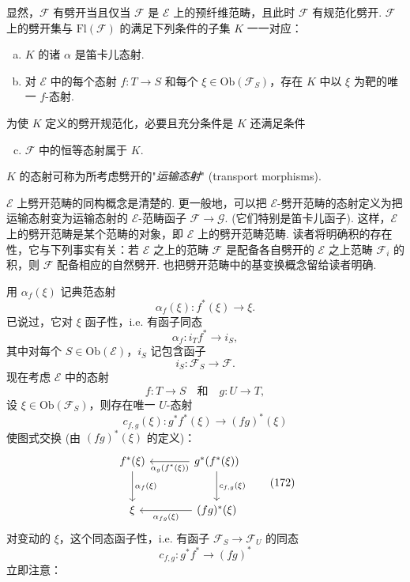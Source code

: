 显然，$\mathcal{F}$ 有劈开当且仅当 $\mathcal{F}$ 是 $\mathcal{E}$ 上的预纤维范畴，且此时 $\mathcal{F}$ 有规范化劈开. $\mathcal{F}$ 上的劈开集与 $\mathrm{Fl}(\mathcal{F})$ 的满足下列条件的子集 $K$ 一一对应：
\begin{enumerate}[a)]
\item $K$ 的诸 $\alpha$ 是笛卡儿态射.
\item 对 $\mathcal{E}$ 中的每个态射 $f \colon T \to S$ 和每个 $\xi \in \mathrm{Ob}(\mathcal{F}_S)$，存在 $K$ 中以 $\xi$ 为靶的唯一 $f$-态射.
\end{enumerate}
为使 $K$ 定义的劈开规范化，必要且充分条件是 $K$ 还满足条件
\begin{enumerate}[a)]
\setcounter{enumi}{2}
\item $\mathcal{F}$ 中的恒等态射属于 $K$.
\end{enumerate}
$K$ 的态射可称为所考虑劈开的"\emph{运输态射}" (transport morphisms).

$\mathcal{E}$ 上劈开范畴的同构概念是清楚的. 更一般地，可以把 $\mathcal{E}$-劈开范畴的态射定义为把运输态射变为运输态射的 $\mathcal{E}$-范畴函子 $\mathcal{F} \to \mathcal{G}$. (它们特别是笛卡儿函子). 这样，$\mathcal{E}$ 上的劈开范畴是某个范畴的对象，即 $\mathcal{E}$ 上的劈开范畴范畴. 读者将明确积的存在性，它与下列事实有关：若 $\mathcal{E}$ 之上的范畴 $\mathcal{F}$ 是配备各自劈开的 $\mathcal{E}$ 之上范畴 $\mathcal{F}_i$ 的积，则 $\mathcal{F}$ 配备相应的自然劈开. 也把劈开范畴中的基变换概念留给读者明确.

用 $\alpha_f(\xi)$ 记典范态射
\[
\alpha_f(\xi) \colon f^{*}(\xi) \longrightarrow \xi.
\]
已说过，它对 $\xi$ 函子性，i.e. 有函子同态
\[
\alpha_f \colon i_T f^{*} \longrightarrow i_S,
\]
其中对每个 $S \in \mathrm{Ob}(\mathcal{E})$，$i_S$ 记包含函子
\[
i_S \colon \mathcal{F}_S \longrightarrow \mathcal{F}.
\]
现在考虑 $\mathcal{E}$ 中的态射
\[
f \colon T \longrightarrow S \quad \text{和} \quad g \colon U \longrightarrow T,
\]
设 $\xi \in \mathrm{Ob}(\mathcal{F}_S)$，则存在唯一 $U$-态射
\[
c_{f,g}(\xi) \colon g^{*} f^{*}(\xi) \longrightarrow (fg)^{*}(\xi)
\]
使图式交换 (由 $(fg)^{*}(\xi)$ 的定义)：
\begin{equation}
\begin{tikzcd}[row sep=large, column sep=large]
f^{*}(\xi) \arrow[d,"{\alpha_f(\xi)}"] & g^{*}(f^{*}(\xi)) \arrow[l,"{\alpha_g(f^{*}(\xi))}"] \arrow[d,"{c_{f,g}(\xi)}"] \\
\xi & (fg)^{*}(\xi) \arrow[l,"{\alpha_{fg}(\xi)}"]
\end{tikzcd} \tag{172}
\label{eq:VI.172}
\end{equation}
对变动的 $\xi$，这个同态函子性，i.e. 有函子 $\mathcal{F}_S \to \mathcal{F}_U$ 的同态
\[
c_{f,g} \colon g^{*} f^{*} \longrightarrow (fg)^{*}
\]
立即注意：

